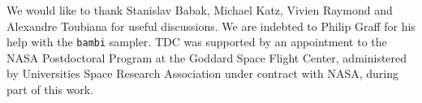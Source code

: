 \documentclass[aps,showpacs,twocolumn,prd,superscriptaddress,nofootinbib]{revtex4-1}
\begin{document}

%
%
%


\begin{acknowledgments}

We would like to thank Stanislav Babak, Michael Katz, Vivien Raymond and Alexandre Toubiana for useful discussions.
We are indebted to Philip Graff for his help with the \texttt{bambi} sampler.
TDC was supported by an appointment to the NASA Postdoctoral Program at the Goddard Space Flight Center, administered by Universities Space Research Association under contract with NASA, during part of this work.

\end{acknowledgments}


\end{document}
